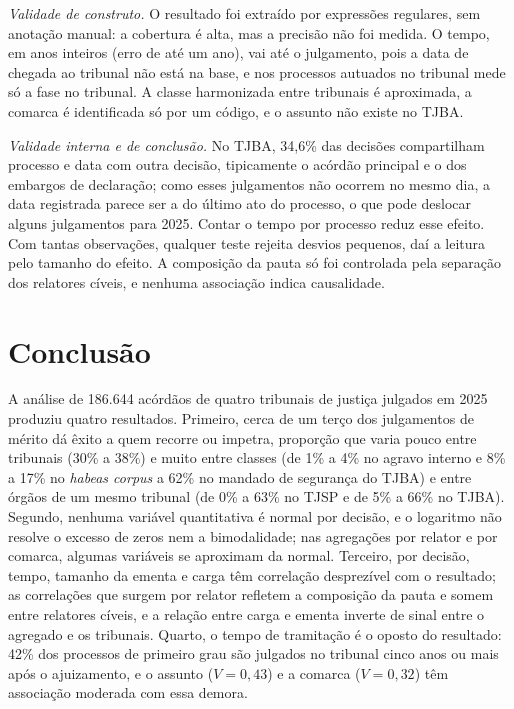 \documentclass[conference]{IEEEtran}
\begin{document}
\emph{Validade de construto.} O resultado foi extraído por expressões
regulares, sem anotação manual: a cobertura é alta, mas a precisão não foi
medida. O tempo, em anos inteiros (erro de até um ano), vai até o julgamento,
pois a data de chegada ao tribunal não está na base, e nos processos autuados
no tribunal mede só a fase no tribunal. A classe harmonizada entre tribunais é aproximada, a comarca é
identificada só por um código, e o assunto não existe no TJBA.

\emph{Validade interna e de conclusão.} No TJBA, 34,6\% das decisões
compartilham processo e data com outra decisão, tipicamente o acórdão principal
e o dos embargos de declaração; como esses julgamentos não ocorrem no mesmo dia,
a data registrada parece ser a do último ato do processo, o que pode deslocar
alguns julgamentos para 2025. Contar o tempo por processo reduz esse efeito. Com
tantas observações, qualquer teste rejeita desvios pequenos, daí a leitura pelo
tamanho do efeito. A composição da pauta só foi controlada pela separação dos
relatores cíveis, e nenhuma associação indica causalidade.

\section{Conclusão}\label{sec:conclusao}
\balance

A análise de 186.644 acórdãos de quatro tribunais de justiça julgados em 2025
produziu quatro resultados. Primeiro, cerca de um terço dos julgamentos de
mérito dá êxito a quem recorre ou impetra, proporção que varia pouco entre
tribunais (30\% a 38\%) e muito entre classes (de 1\% a 4\% no agravo interno
e 8\% a 17\% no \emph{habeas corpus} a 62\% no mandado de segurança do TJBA) e
entre órgãos de um mesmo tribunal (de 0\% a 63\% no TJSP e de 5\% a 66\% no
TJBA). Segundo,
nenhuma variável quantitativa é normal por decisão, e o logaritmo não resolve
o excesso de zeros nem a bimodalidade; nas agregações por relator e por comarca,
algumas variáveis se aproximam da normal. Terceiro, por decisão, tempo,
tamanho da ementa e carga têm correlação desprezível com o resultado; as
correlações que surgem por relator refletem a composição da pauta e somem
entre relatores cíveis, e a relação entre carga e ementa inverte de sinal
entre o agregado e os tribunais. Quarto, o tempo de
tramitação é o oposto do resultado: 42\% dos processos de primeiro grau são
julgados no tribunal cinco anos ou mais após o ajuizamento, e o assunto
($V = 0{,}43$) e a comarca ($V = 0{,}32$) têm associação moderada com essa
demora.
\end{document}
